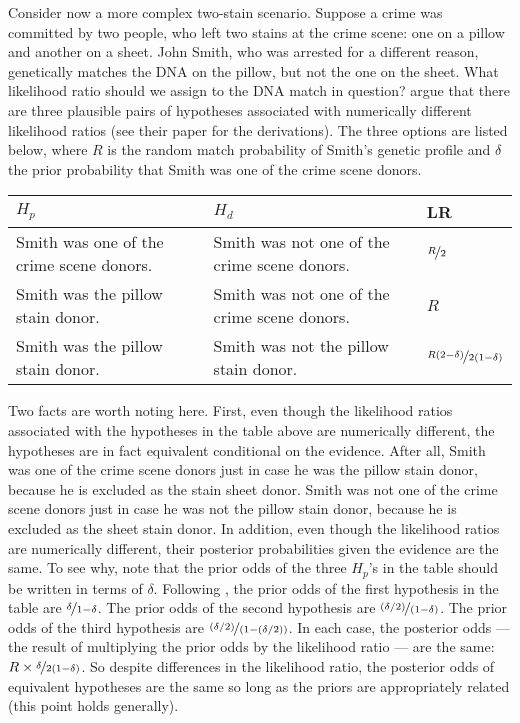 \documentclass{article}
\begin{document}
Consider now a more complex two-stain scenario. Suppose a crime was committed by two people, who left two stains at the crime scene: one on a pillow and another on a sheet. John Smith, who was arrested for a different reason, genetically matches the DNA on the pillow, but not the one on the sheet. What likelihood ratio should we assign to the DNA match in question? \cite{meester2004WhyEffectPriora} argue that there are  three plausible pairs of hypotheses associated with numerically different likelihood ratios (see their paper for the derivations). The three options are listed below, where $R$ is the random match probability of Smith's genetic profile and $\delta$ the prior probability that Smith was one of the crime scene donors.
%
\begin{center}
	\footnotesize
	\begin{tabular}{@{}p{5cm}p{5cm}l@{}}
		\toprule
		$H_p$ & $H_d$  & LR \\ \midrule
		Smith was one of the crime scene donors.   &  Smith was not one of the crime scene donors. & $\nicefrac{R}{2}$   \\
		Smith was the pillow stain donor.     & Smith was not one of the crime scene donors.& $R$\\
		Smith was the pillow stain donor. & Smith was not the pillow stain donor. &  $\nicefrac{R(2-\delta)}{2(1-\delta)}$
		\\ \bottomrule
	\end{tabular}
\end{center}
\normalsize

\noindent

Two facts are worth noting here. 
First, even though 
the likelihood ratios associated with the hypotheses in the table above are numerically different, the hypotheses are in fact equivalent conditional on the evidence. After all, Smith was one of the crime scene donors just in case he was the pillow stain donor, because he is excluded as the stain sheet donor. Smith was not one of the crime scene donors just in case he was not the pillow stain donor, because  he is excluded as the sheet stain donor.  
%
%
In addition, even though the likelihood ratios are numerically different, their posterior probabilities given the evidence are the same. 
 To see why, note that the prior odds of the three $H_p$'s in the table should be written in terms of $\delta$. Following  \cite{meester2004WhyEffectPriora},
 the prior odds of the first hypothesis in the table are  $\nicefrac{\delta}{1-\delta}$. The prior odds of the second hypothesis are  $\nicefrac{(\delta/2)}{(1-\delta)}$. The prior odds of the third  hypothesis are $\nicefrac{(\delta/2)}{(1-(\delta/2))}$. In each case, the posterior odds --- the result of multiplying the prior odds by the likelihood ratio --- are the same: $R\times \nicefrac{\delta}{2(1-\delta)}$. So despite differences in the likelihood ratio, the posterior odds of equivalent hypotheses are the same so long as the priors are appropriately related (this point holds generally).  
\end{document}
